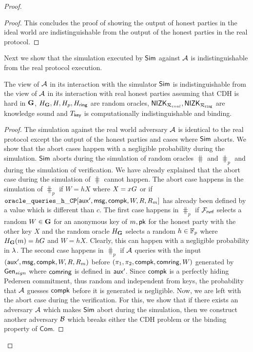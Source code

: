 \begin{proof}
\begin{proof}
			This concludes the proof of showing the output of honest parties in the ideal world are indistinguishable from the output of the honest parties in the real protocol.
		\end{proof}	
		
		Next we show that the simulation executed by $ \mathsf{Sim} $ against $ \mathcal{A} $ is indistinguishable from the real protocol execution.
		
		\begin{lemma} \label{lem:simulation-ind}
			The view of $ \mathcal{A} $ in its interaction with the simulator $ \mathsf{Sim} $ is indistinguishable from the view of $ \mathcal{A} $ in its interaction with real honest parties assuming that CDH is hard in $ {\mathbf{G}} $, $H_{\mathbf{G}}, H, H_p, H_\mathsf{ring} $ are random oracles, $ {\mathsf{NIZK}}_{\mathcal{R}_{eval}}, {\mathsf{NIZK}}_{\mathcal{R}_{\mathtt{ring}}} $ are knowledge sound and $ T_{\mathsf{key}} $ is computationally indistinguishable and binding.
		\end{lemma}
		
		
		\begin{proof}
			The  simulation against the real world adversary $ \mathcal{A} $ is identical to the real protocol except the output of the honest parties and cases where $ \mathsf{Sim} $ aborts. 
			We show that the abort cases happen with a negligible probability during the simulation. $ \mathsf{Sim} $ aborts during the simulation of random oracles $ \hash $ and $ \hash_p $ and during the simulation of verification. We have already explained that the abort case during the simulation of $ \hash $ cannot happen. The abort case happens in the simulation of $ \hash_p $ if $ W = hX $ where $ X = xG $ or if $ \mathtt{oracle\_queries\_h\_CP}[\mathsf{aux}', \mathsf{msg},\mathsf{compk},W,R,R_m] $ has already been defined by a value which is different than $ c $. The first case happens in $ \hash_p $ if $ \mathcal{F}_{\textsf{rvrf}} $ selects a random $ W \in {\mathbf{G}}$ for an anonymous key of $ m, \mathsf{pk}  $ for the honest party with the other key $ X  $ and the random oracle $ H_{\mathbf{G}} $ selects a random $ h \in \mathbb{F}_p  $ where $ H_{\mathbf{G}}(m) = hG $ and $ W = hX $. Clearly, this can happen with a negligible probability in $ \lambda $. The 
			second case happens in $ \hash_p $ if $ \mathcal{A} $ queries with the input $ (\mathsf{aux}', \mathsf{msg},\mathsf{compk},W,R,R_m) $ before $ (\pi_1,\pi_2,\mathsf{compk},\mathsf{comring},W) $ generated by $ \mathsf{Gen}_{sign} $ where $ \mathsf{comring} $ is defined in $ \mathsf{aux}' $. Since $ \mathsf{compk} $ is a perfectly hiding Pedersen commitment, thus random and independent from keys, the probability that $ \mathcal{A} $ guesses $ \mathsf{compk} $ before it is generated is negligible.
			Now, we are left with the abort case during the verification.
			For this, we show that if there exists an adversary $ \mathcal{A} $ which makes $ \mathsf{Sim} $ abort during the simulation, then we construct another adversary $ \mathcal{B} $ which breaks either the CDH problem or the binding property of $ \mathsf{Com}$.
			

\end{proof}
\end{proof}
